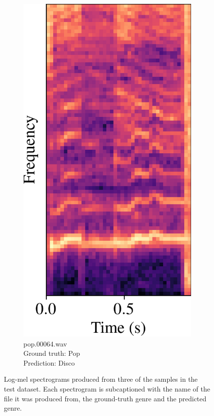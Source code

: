 \documentclass[conference]{IEEEtran}
\begin{document}
\begin{figure}[htbp]
\begin{subfigure}[b]{0.32\columnwidth}
        \label{spec_incorrect_1}
    \end{subfigure}
    \hfill
    \begin{subfigure}[b]{0.32\columnwidth}
        \centerline{\includegraphics[width=\columnwidth]{spec_incorrect_2.png}}
        \caption{pop.00064.wav\\Ground truth: Pop\\Prediction: Disco}
        \label{spec_incorrect_2}
    \end{subfigure}
    \caption{
        Log-mel spectrograms produced from three of the samples in the test dataset.
        Each spectrogram is subcaptioned with the name of the file it was produced from, the ground-truth genre and the predicted genre.
    }
    \label{spectrograms}
\end{figure}
\end{document}
